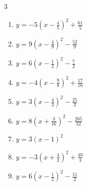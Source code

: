 \begin{multicols}{3}
\begin{enumerate}

\columnbreak %

\resetques

  \item $\displaystyle y=-5\left( x-\frac{4}{5}\right)^{2}+\frac{61}{5}$


  \item $\displaystyle y=9\left( x-\frac{4}{9}\right)^{2}-\frac{52}{9}$


  \item $\displaystyle y=6\left( x-\frac{1}{2}\right)^{2}-\frac{7}{2}$


  \item $\displaystyle y=-4\left( x-\frac{9}{8}\right)^{2}+\frac{17}{16}$


  \item $\displaystyle y=3\left( x-\frac{4}{3}\right)^{2}-\frac{25}{3}$


  \item $\displaystyle y=8\left( x+\frac{3}{16}\right)^{2}-\frac{265}{32}$


  \item $\displaystyle y=3\left( x-1\right)^{2}$

        \phantom{$\displaystyle 頂点\left( 1 , 0 \right)$}

  \item $\displaystyle y=-3\left( x+\frac{4}{3}\right)^{2}+\frac{40}{3}$


  \item $\displaystyle y=6\left( x-\frac{1}{2}\right)^{2}-\frac{11}{2}$



\end{enumerate}
\end{multicols}
